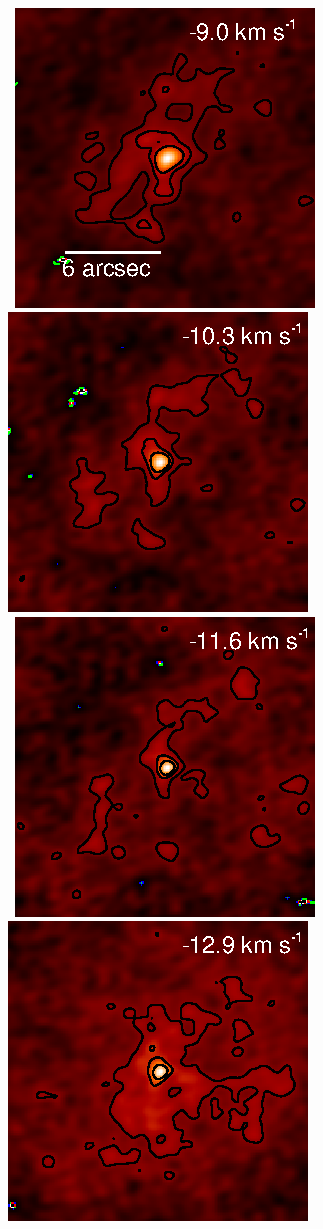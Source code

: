 \documentclass[preprint]{aastex}
\begin{document}
\begin{figure}%
\\
\mbox{
          \includegraphics[]{test__34.ps}
          \includegraphics[]{test__35.ps}
          }
\\
\mbox{
          \includegraphics[]{test__36.ps}
          \includegraphics[]{test__37.ps}
}
\end{figure}
\end{document}
